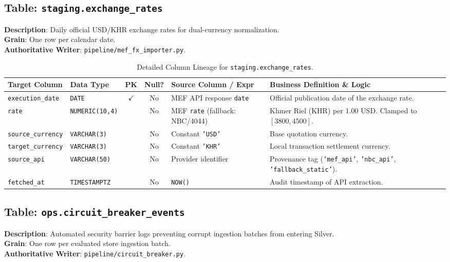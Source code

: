 \documentclass[a4paper, 11pt]{article}
\begin{document}
\subsection{Table: \texttt{staging.exchange\_rates}}
\textbf{Description}: Daily official USD/KHR exchange rates for dual-currency normalization. \\
\textbf{Grain}: One row per calendar date. \\
\textbf{Authoritative Writer}: \texttt{pipeline/mef\_fx\_importer.py}.

\begin{table}[H]
\centering
\small
\begin{tabularx}{\textwidth}{l p{2.8cm} c c p{4.0cm} X}
\toprule
\textbf{Target Column} & \textbf{Data Type} & \textbf{PK} & \textbf{Null?} & \textbf{Source Column / Expr} & \textbf{Business Definition \& Logic} \\
\midrule
\texttt{execution\_date} & \texttt{DATE} & $\checkmark$ & No & MEF API response \texttt{date} & Official publication date of the exchange rate. \\
\texttt{rate} & \texttt{NUMERIC(10,4)} & & No & MEF \texttt{rate} (fallback: NBC/4044) & Khmer Riel (KHR) per 1.00 USD. Clamped to $[3800, 4500]$. \\
\texttt{source\_currency} & \texttt{VARCHAR(3)} & & No & Constant \texttt{'USD'} & Base quotation currency. \\
\texttt{target\_currency} & \texttt{VARCHAR(3)} & & No & Constant \texttt{'KHR'} & Local transaction settlement currency. \\
\texttt{source\_api} & \texttt{VARCHAR(50)} & & No & Provider identifier & Provenance tag (\texttt{'mef\_api'}, \texttt{'nbc\_api'}, \texttt{'fallback\_static'}). \\
\texttt{fetched\_at} & \texttt{TIMESTAMPTZ} & & No & \texttt{NOW()} & Audit timestamp of API extraction. \\
\bottomrule
\end{tabularx}
\caption{Detailed Column Lineage for \texttt{staging.exchange\_rates}.}
\end{table}

\subsection{Table: \texttt{ops.circuit\_breaker\_events}}
\textbf{Description}: Automated security barrier logs preventing corrupt ingestion batches from entering Silver. \\
\textbf{Grain}: One row per evaluated store ingestion batch. \\
\textbf{Authoritative Writer}: \texttt{pipeline/circuit\_breaker.py}.
\end{document}
